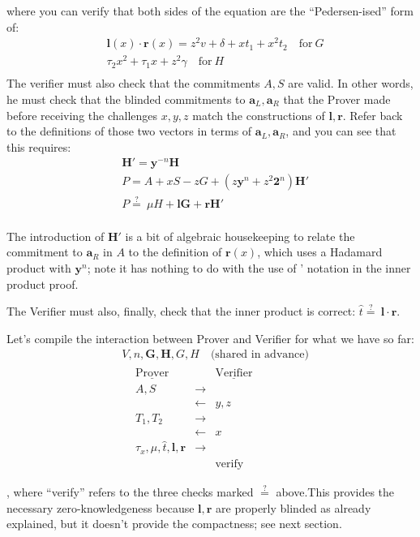 \documentclass[10pt,a4paper]{article}
\begin{document}
where you can verify that both sides of the equation are the
``Pedersen-ised'' form of:
\begin{align*}
& \textbf{l}(x)\cdot\textbf{r}(x) = z^2 v + \delta + xt_1 + x^2t_2 \quad \textrm{for}\ G \\
& \tau_2x^2 + \tau_1x + z^2 \gamma \quad \textrm{for}\ H \\
\end{align*}
The verifier must also check that the commitments $A, S$ are valid. In other
words, he must check that the blinded commitments to $\textbf{a}_L, \textbf{a}_R$ that the Prover
made before receiving the challenges $x, y, z$ match the constructions of $\mathbf{l}, \mathbf{r}$.
Refer back to the definitions of those two vectors in terms of $\textbf{a}_L, \textbf{a}_R$, and you
can see that this requires:
\begin{align*}
& \textbf{H}' = \textbf{y}^{-n}\textbf{H} \\
& P = A + xS -zG + \left(z\textbf{y}^n + z^2\textbf{2}^n\right)\textbf{H}' \\
& P \stackrel{?}{=} \ \mu H + \textbf{lG} + \textbf{rH}' \\
\end{align*}

The introduction of $\mathbf{H}'$ is a bit of algebraic housekeeping to relate the
commitment to $\mathbf{a}_R$ in $A$ to the definition of $\mathbf{r}(x)$, which uses a Hadamard product
with $\mathbf{y}^n$; note it has nothing to do with the use of ' notation in the inner
product proof.

The Verifier must also, finally, check that the inner product is
correct: $\hat{t} \stackrel{?}{=} \ \textbf{l} \cdot \textbf{r}$.

Let's compile the interaction between Prover and Verifier for what we
have so far:
\begin{align*}
&V, n, \textbf{G}, \textbf{H}, G, H\quad \textrm{(shared in advance)}  \\
& \begin{matrix} 
& \underline{\textrm{Prover}} &  &\underline{\textrm{Verifier}}  &\\
 &  A, S & \rightarrow & &\\
 & & \leftarrow & y, z & \\
  & T_1, T_2 & \rightarrow & & \\
 & & \leftarrow & x & \\
 & \tau_x, \mu, \hat{t}, \textbf{l}, \textbf{r} & \rightarrow & & \\
 & & & \textrm{verify} & \\
\end{matrix} \\
\end{align*}
, where ``verify'' refers to the three checks marked $\stackrel{?}{=}$ above.This provides
the necessary zero-knowledgeness because $\mathbf{l}, \mathbf{r}$ are properly blinded as already
explained, but it doesn't provide the compactness; see next section.
\end{document}
